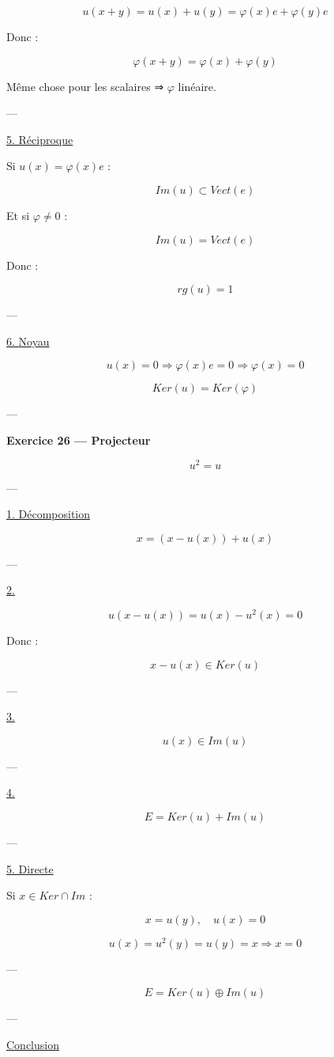 \documentclass[11pt,a4paper]{article}
\begin{document}
\[
u(x+y)=u(x)+u(y)=\varphi(x)e+\varphi(y)e
\]

Donc :

\[
\varphi(x+y)=\varphi(x)+\varphi(y)
\]

Même chose pour les scalaires ⇒ $\varphi$ linéaire.

---

\underline{5. Réciproque}

Si $u(x)=\varphi(x)e$ :

\[
Im(u) \subset Vect(e)
\]

Et si $\varphi \neq 0$ :

\[
Im(u)=Vect(e)
\]

Donc :

\[
rg(u)=1
\]

---

\underline{6. Noyau}

\[
u(x)=0 \Rightarrow \varphi(x)e=0 \Rightarrow \varphi(x)=0
\]

\[
\boxed{Ker(u)=Ker(\varphi)}
\]

---

\textbf{Exercice 26 — Projecteur}

\[
u^2=u
\]

---

\underline{1. Décomposition}

\[
x = (x-u(x)) + u(x)
\]

---

\underline{2.}

\[
u(x-u(x))=u(x)-u^2(x)=0
\]

Donc :

\[
x-u(x)\in Ker(u)
\]

---

\underline{3.}

\[
u(x)\in Im(u)
\]

---

\underline{4.}

\[
E = Ker(u) + Im(u)
\]

---

\underline{5. Directe}

Si $x \in Ker \cap Im$ :

\[
x=u(y), \quad u(x)=0
\]

\[
u(x)=u^2(y)=u(y)=x
\Rightarrow x=0
\]

---

\[
\boxed{E=Ker(u)\oplus Im(u)}
\]

---

\underline{Conclusion}
\end{document}
